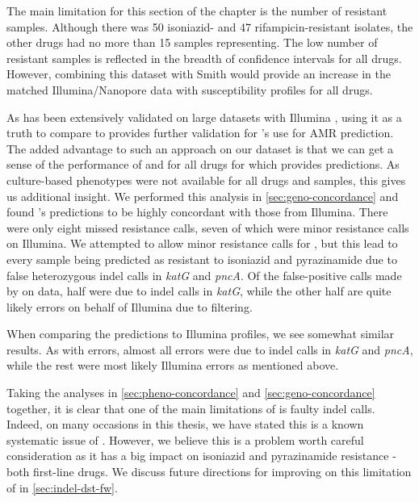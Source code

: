 The main limitation for this section of the chapter is the number of resistant samples. Although there was 50 isoniazid- and 47 rifampicin-resistant isolates, the other drugs had no more than 15 samples representing. The low number of resistant samples is reflected in the breadth of confidence intervals for all drugs. However, combining this dataset with Smith \etal{} \cite{smith2020} would provide an increase in the matched Illumina/Nanopore data with susceptibility profiles for all drugs.

\noindent
As \mykrobe{} has been extensively validated on large datasets with Illumina \cite{bradley2015,hunt2019}, using it as a truth to compare \ont{} to provides further validation for \ont{}'s use for AMR prediction. The added advantage to such an approach on our dataset is that we can get a sense of the performance of \drprg{} and \mykrobe{} \ont{} for all drugs for which \mykrobe{} provides predictions. As culture-based phenotypes were not available for all drugs and samples, this gives us additional insight. We performed this analysis in \autoref{sec:geno-concordance} and found \mykrobe{}'s \ont{} predictions to be highly concordant with those from Illumina. There were only eight missed resistance calls, seven of which were minor resistance calls on Illumina. We attempted to allow minor resistance calls for \ont{}, but this lead to every sample being predicted as resistant to isoniazid and pyrazinamide due to false heterozygous indel calls in \textit{katG} and \textit{pncA}. Of the false-positive calls made by \mykrobe{} on \ont{} data, half were due to indel calls in \textit{katG}, while the other half are quite likely errors on behalf of Illumina due to filtering.

When comparing the \drprg{} predictions to \mykrobe{} Illumina profiles, we see somewhat similar results. As with \mykrobe{} \ont{} errors, almost all \drprg{} errors were due to indel calls in \textit{katG} and \textit{pncA}, while the rest were most likely Illumina errors as mentioned above. 

Taking the analyses in \autoref{sec:pheno-concordance} and \autoref{sec:geno-concordance} together, it is clear that one of the main limitations of \drprg{} is faulty indel calls. Indeed, on many occasions in this thesis, we have stated this is a known systematic issue of \ont{} \cite{watson2019}. However, we believe this is a problem worth careful consideration as it has a big impact on isoniazid and pyrazinamide resistance - both first-line \mtb{} drugs. We discuss future directions for improving on this limitation of \drprg{} in \autoref{sec:indel-dst-fw}.

